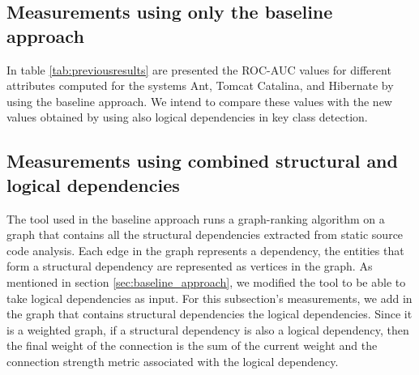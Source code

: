 \documentclass[runningheads]{comsis2}
\begin{document}
\subsection{Measurements using only the baseline approach}
\label{sec:measure_baseline}

In table \ref{tab:previousresults} are presented the ROC-AUC values for different attributes computed for the systems Ant, Tomcat Catalina, and Hibernate by using the baseline approach. We intend to compare these values with the new values obtained by using also logical dependencies in key class detection.

\begin{table}[!h]
\renewcommand{\arraystretch}{1}
\caption{ROC-AUC metric values extracted. }
\label{tab:previousresults}
\centering
{}
\end{table}





\subsection{Measurements using combined structural and logical dependencies}
\label{sec:measure_ld_sd}

The tool used in the baseline approach runs a graph-ranking algorithm on a graph that contains all the structural dependencies extracted from static source code analysis.
Each edge in the graph represents a dependency, the entities that form a structural dependency are represented as vertices in the graph. 
As mentioned in section \ref{sec:baseline_approach}, we modified the tool to be able to take logical dependencies as input.
For this subsection's measurements, we add in the graph that contains structural dependencies the logical dependencies. Since it is a weighted graph, if a structural dependency is also a logical dependency, then the final weight of the connection is the sum of the current weight and the connection strength metric associated with the logical dependency. 
\end{document}
